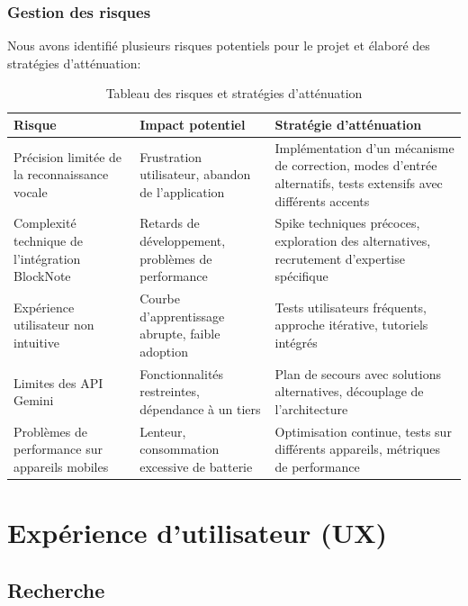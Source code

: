 \subsubsection{Gestion des risques}
    
    Nous avons identifié plusieurs risques potentiels pour le projet et élaboré des stratégies d'atténuation:
    
    \begin{table}[H]
    \centering
    \begin{tabular}{|p{3cm}|p{5cm}|p{5cm}|}
    \hline
    \textbf{Risque} & \textbf{Impact potentiel} & \textbf{Stratégie d'atténuation} \\
    \hline
    Précision limitée de la reconnaissance vocale & Frustration utilisateur, abandon de l'application & Implémentation d'un mécanisme de correction, modes d'entrée alternatifs, tests extensifs avec différents accents \\
    \hline
    Complexité technique de l'intégration BlockNote & Retards de développement, problèmes de performance & Spike techniques précoces, exploration des alternatives, recrutement d'expertise spécifique \\
    \hline
    Expérience utilisateur non intuitive & Courbe d'apprentissage abrupte, faible adoption & Tests utilisateurs fréquents, approche itérative, tutoriels intégrés \\
    \hline
    Limites des API Gemini & Fonctionnalités restreintes, dépendance à un tiers & Plan de secours avec solutions alternatives, découplage de l'architecture \\
    \hline
    Problèmes de performance sur appareils mobiles & Lenteur, consommation excessive de batterie & Optimisation continue, tests sur différents appareils, métriques de performance \\
    \hline
    \end{tabular}
    \caption{Tableau des risques et stratégies d'atténuation}
    \label{tab:risk_management}
    \end{table}
    
    \section{Expérience d'utilisateur (UX)}
    
    \subsection{Recherche}
    
